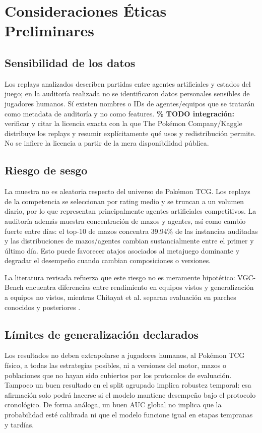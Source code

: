 \section{Consideraciones Éticas Preliminares}
\label{sec:etica}

\subsection{Sensibilidad de los datos}
\label{subsec:sensibilidad}
Los replays analizados describen partidas entre agentes artificiales y
estados del juego; en la auditoría realizada no se identificaron datos
personales sensibles de jugadores humanos. Sí existen nombres o IDs de
agentes/equipos que se tratarán como metadata de auditoría y no como
features. \textbf{\% TODO integración:} verificar y citar la licencia
exacta con la que The Pokémon Company/Kaggle distribuye los replays y
resumir explícitamente qué usos y redistribución permite. No se infiere
la licencia a partir de la mera disponibilidad pública.

\subsection{Riesgo de sesgo}
\label{subsec:sesgo}
La muestra no es aleatoria respecto del universo de Pokémon TCG. Los
replays de la competencia se seleccionan por rating medio y se truncan
a un volumen diario, por lo que representan principalmente agentes
artificiales competitivos. La auditoría además muestra concentración de
mazos y agentes, así como cambio fuerte entre días: el top-10 de mazos
concentra 39.94\% de las instancias auditadas y las distribuciones de
mazos/agentes cambian sustancialmente entre el primer y último día.
Esto puede favorecer atajos asociados al metajuego dominante y degradar
el desempeño cuando cambian composiciones o versiones.

La literatura revisada refuerza que este riesgo no es meramente
hipotético: VGC-Bench encuentra diferencias entre rendimiento en equipos
vistos y generalización a equipos no vistos, mientras Chitayat et al.
separan evaluación en parches conocidos y posteriores
\cite{angliss_vgcbench_2026,chitayat_meta_2023}.

\subsection{Límites de generalización declarados}
\label{subsec:limitesgeneralizacion}
Los resultados no deben extrapolarse a jugadores humanos, al Pokémon
TCG físico, a todas las estrategias posibles, ni a versiones del motor,
mazos o poblaciones que no hayan sido cubiertos por los protocolos de
evaluación. Tampoco un buen resultado en el split agrupado implica
robustez temporal: esa afirmación solo podrá hacerse si el modelo
mantiene desempeño bajo el protocolo cronológico. De forma análoga, un
buen AUC global no implica que la probabilidad esté calibrada ni que el
modelo funcione igual en etapas tempranas y tardías.

